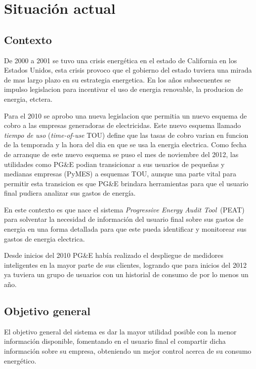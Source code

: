 \chapter{Situación actual}

\section{Contexto}
De 2000 a 2001 se tuvo una crisis energética en el estado de California en los Estados Unidos, esta crisis provoco que el gobierno del estado tuviera una mirada de mas largo plazo en su estrategia energetica. En los años subsecuentes se impulso legislacion para incentivar el uso de energia renovable, la producion de energia, etctera.

Para el 2010 se aprobo una nueva legislacion que permitia un nuevo esquema de cobro a las empresas generadoras de electricidas. Este nuevo esquema llamado \textit{tiempo de uso} (\textit{time-of-use} TOU) define que las tasas de cobro varian en funcion de la temporada y la hora del dia en que se usa la energia electrica. Como fecha de arranque de este nuevo esquema se puso el mes de noviembre del 2012, las utilidades como PG\&E podian transicionar a sus usuarios de pequeñas y medianas empresas (PyMES) a esquemas TOU, aunque una parte vital para permitir esta transicion es que PG\&E brindara herramientas para que el usuario final pudiera analizar sus gastos de energía.

En este contexto es que nace el sistema \textit{Progressive Energy Audit Tool}\ (PEAT) para solventar la necesidad de información del usuario final sobre sus gastos de energia en una forma detallada para que este pueda identificar y monitorear sus gastos de energia electrica.

Desde inicios del 2010 PG\&E había realizado el despliegue de medidores inteligentes en la mayor parte de sus clientes, logrando que para inicios del 2012 ya tuviera un grupo de usuarios con un historial de consumo de por lo menos un año.

\section{Objetivo general}

El objetivo general del sistema es dar la mayor utilidad posible con la menor
información disponible, fomentando en el usuario final el compartir dicha
información sobre su empresa, obteniendo un mejor control
acerca de su consumo energético.
